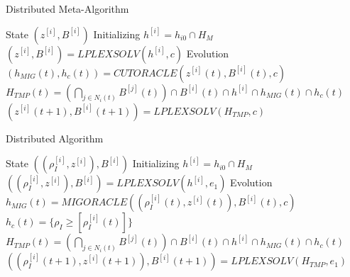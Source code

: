 \begin{latin}
	\begin{algorithm}
		\caption{Distributed Meta-Algorithm}
		\label{alg:distributed:int_distributed}
		\begin{algorithmic}[1]
			\Statex State $(z^{[i]},B^{[i]})$
			\Statex Initializing    
			\State $h^{[i]} = h_{i0} \cap H_M$
			\State $(z^{[i]},B^{[i]}) = LPLEXSOLV(h^{[i]}, c)$
			\Statex Evolution 
			\State $(h_{MIG}(t),h_c(t)) = CUTORACLE(z^{[i]}(t),B^{[i]}(t),c)$
			\State $\displaystyle H_{TMP}(t) = (\bigcap_{j \in N_i(t)}B^{[j]}(t)) \cap B^{[i]}(t) \cap h^{[i]} \cap h_{MIG}(t) \cap h_c(t)$
			\State $(z^{[i]}(t+1),B^{[i]}(t+1)) = LPLEXSOLV(H_{TMP}, c)$
		\end{algorithmic}
	\end{algorithm}
\end{latin}

\begin{latin}
	\begin{algorithm}
		\caption{Distributed Algorithm}
		\label{alg:distributed:epsilon_distributed}
		\begin{algorithmic}[1]
			\Statex State $((\rho_I^{[i]},z^{[i]}),B^{[i]})$
			\Statex Initializing    
			\State $h^{[i]} = h_{i0} \cap H_M$
			\State $((\rho_I^{[i]},z^{[i]}),B^{[i]}) = LPLEXSOLV(h^{[i]}, e_1)$
			\Statex Evolution 
			\State $h_{MIG}(t) = MIGORACLE((\rho_I^{[i]}(t),z^{[i]}(t)),B^{[i]}(t),c)$
			\State $h_c(t) = \{ \rho_I \ge [\rho_I^{[i]}(t)] \}$
			\State $\displaystyle H_{TMP}(t) = (\bigcap_{j \in N_i(t)}B^{[j]}(t)) \cap B^{[i]}(t) \cap h^{[i]} \cap h_{MIG}(t) \cap h_c(t)$
			\State $((\rho_I^{[i]}(t+1),z^{[i]}(t+1)),B^{[i]}(t+1)) = LPLEXSOLV(H_{TMP}, e_1)$
		\end{algorithmic}
	\end{algorithm}
\end{latin}





